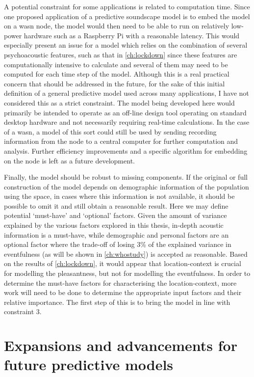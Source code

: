 A potential constraint for some applications is related to computation time. Since one proposed application of a predictive soundscape model is to embed the model on a \gls{wasn} node, the model would then need to be able to run on relatively low-power hardware such as a Raspberry Pi with a reasonable latency. This would especially present an issue for a model which relies on the combination of several psychoacoustic features, such as that in \cref{ch:lockdown} since these features are computationally intensive to calculate and several of them may need to be computed for each time step of the model. Although this is a real practical concern that should be addressed in the future, for the sake of this initial definition of a general predictive model used across many applications, I have not considered this as a strict constraint. The model being developed here would primarily be intended to operate as an off-line design tool operating on standard desktop hardware and not necessarily requiring real-time calculations. In the case of a \gls{wasn}, a model of this sort could still be used by sending recording information from the node to a central computer for further computation and analysis. Further efficiency improvements and a specific algorithm for embedding on the node is left as a future development.

Finally, the model should be robust to missing components. If the original or full construction of the model depends on demographic information of the population using the space, in cases where this information is not available, it should be possible to omit it and still obtain a reasonable result. Here we may define potential `must-have’ and `optional’ factors. Given the amount of variance explained by the various factors explored in this thesis, in-depth acoustic information is a must-have, while demographic and personal factors are an optional factor where the trade-off of losing 3\% of the explained variance in eventfulness (as will be shown in \cref{ch:whostudy}) is accepted as reasonable. Based on the results of \cref{ch:lockdown}, it would appear that location-context is crucial for modelling the pleasantness, but not for modelling the eventfulness. In order to determine the must-have factors for characterising the location-context, more work will need to be done to determine the appropriate input factors and their relative importance. The first step of this is to bring the model in line with constraint 3.

\section{Expansions and advancements for future predictive models}

